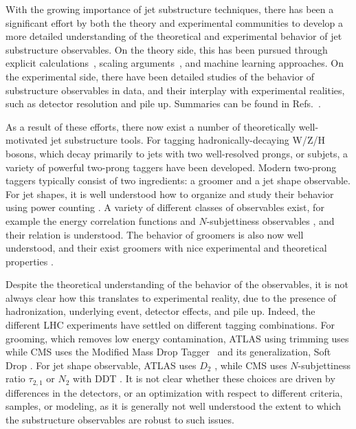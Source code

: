 \documentclass[11pt,letterpaper]{article}
\DeclareRobustCommand{\Refs}[1]{Refs.~\cite{#1}}
\begin{document}
With the growing importance of jet substructure techniques, there has been a significant effort by both the theory and experimental communities to develop a more detailed understanding of the theoretical and experimental behavior of jet substructure observables.
%
On the theory side, this has been pursued through explicit calculations~\cite{Feige:2012vc,Field:2012rw,Dasgupta:2013ihk,Dasgupta:2013via,Larkoski:2014pca,Dasgupta:2015yua,Seymour:1997kj,Li:2011hy,Larkoski:2012eh,Jankowiak:2012na,Chien:2014nsa,Chien:2014zna,Isaacson:2015fra,Krohn:2012fg,Waalewijn:2012sv,Larkoski:2014tva,Procura:2014cba,Bertolini:2015pka,Bhattacherjee:2015psa,Larkoski:2015kga,Dasgupta:2015lxh,Frye:2016okc,Frye:2016aiz,Kang:2016ehg,Hornig:2016ahz,Marzani:2017mva}, scaling arguments~\cite{Walsh:2011fz,Larkoski:2014gra,Larkoski:2014zma}, and machine learning \cite{Cogan:2014oua,deOliveira:2015xxd,Almeida:2015jua,Baldi:2016fql,Guest:2016iqz,Conway:2016caq,Barnard:2016qma} approaches.
%
On the experimental side, there have been detailed studies of the behavior of substructure observables in data, and their interplay with experimental realities, such as detector resolution and pile up.
%
Summaries can be found in \Refs{Abdesselam:2010pt,Altheimer:2012mn,Altheimer:2013yza,Adams:2015hiv}.

As a result of these efforts, there now exist a number of theoretically well-motivated jet substructure tools.
%
For tagging hadronically-decaying W/Z/H bosons, which decay primarily to jets with two well-resolved prongs, or subjets, a variety of powerful two-prong taggers have been developed.
%
Modern two-prong taggers typically consist of two ingredients: a groomer and a jet shape observable.
%
For jet shapes, it is well understood how to organize and study their
behavior using power counting \cite{Larkoski:2014gra}.
%
A variety of
different classes of observables exist, for example the energy
correlation functions \cite{Larkoski:2013eya} and $N$-subjettiness
observables \cite{Thaler:2010tr,Thaler:2011gf}, and their relation is
understood.
%
The behavior of groomers is also now well understood, and
their exist groomers with nice experimental and theoretical properties
\cite{Dasgupta:2013ihk,Larkoski:2014wba}.

Despite the
theoretical understanding of the behavior of the observables, it is
not always clear how this translates to experimental reality, due to
the presence of hadronization, underlying event, detector effects, and
pile up.
%
Indeed, the different LHC experiments have settled on different
tagging combinations.
%
For grooming, which removes low energy
contamination,  ATLAS using trimming \cite{Krohn:2009th} uses while CMS uses the Modified
  Mass Drop Tagger~\cite{Dasgupta:2013ihk} and its generalization, Soft Drop \cite{Larkoski:2014wba}.
  For jet shape observable, ATLAS uses $D_2$ \cite{Larkoski:2014gra,Larkoski:2015kga}, while CMS uses $N$-subjettiness ratio $\tau_{2,1}$ \cite{Thaler:2010tr,Thaler:2011gf} or $N_2$ \cite{Moult:2016cvt} with DDT \cite{Dolen:2016kst}.
  It is not clear whether these choices are driven by differences in the detectors, or an optimization with respect to different criteria, samples, or modeling, as it is generally not well understood the extent to which the substructure observables are robust to such issues.
\end{document}
